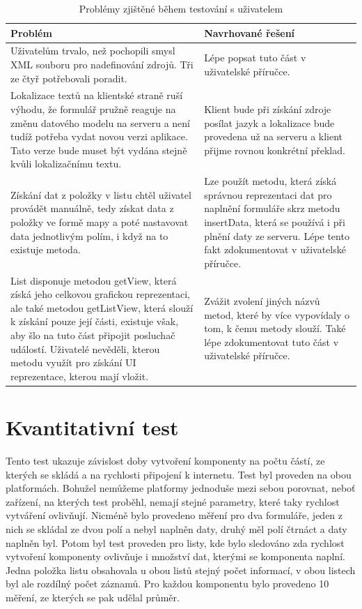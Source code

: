 \begin{table}[h!]
\begin{center}
\caption{Problémy zjištěné během testování s uživatelem}
\label{table:testIssues}
\begin{tabular}{|p{7cm}|p{7cm}|}
\hline
\textbf{Problém} & \textbf{Navrhované řešení} \\
\hline
Uživatelům trvalo, než pochopili smysl XML souboru pro nadefinování zdrojů. Tři ze čtyř potřebovali poradit. & Lépe popsat tuto část v uživatelské příručce. \\
\hline
Lokalizace textů na klientské straně ruší výhodu, že formulář pružně reaguje na změnu datového modelu na serveru a není tudíž potřeba vydat novou verzi aplikace. Tato verze bude muset být vydána stejně kvůli lokalizačnímu textu. & Klient bude při získání zdroje posílat jazyk a lokalizace bude provedena už na serveru a klient přijme rovnou konkrétní překlad. \\
\hline
Získání dat z položky v listu chtěl uživatel provádět manuálně, tedy získat data z položky ve formě mapy a poté nastavovat data jednotlivým polím, i když na to existuje metoda. & Lze použít metodu, která získá správnou reprezentaci dat pro naplnění formuláře skrz metodu insertData, která se používá i při plnění daty ze serveru. Lépe tento fakt zdokumentovat v uživatelské příručce. \\
\hline
List disponuje metodou getView, která získá jeho celkovou grafickou reprezentaci, ale také metodou getListView, která slouží k získání pouze její části, existuje však, aby šlo na tuto část připojit posluchač událostí. Uživatelé nevěděli, kterou metodu využít pro získání UI reprezentace, kterou mají vložit. & Zvážit zvolení jiných názvů metod, které by více vypovídaly o tom, k čemu metody slouží. Také lépe zdokumentovat tuto část v uživatelské příručce. \\
\hline
\end{tabular}
\end{center}
\end{table}

\section{Kvantitativní test} 
Tento test ukazuje závislost doby vytvoření komponenty na počtu částí, ze kterých se skládá a na rychlosti připojení k internetu. Test byl proveden na obou platformách. Bohužel nemůžeme platformy jednoduše mezi sebou porovnat, neboť zařízení, na kterých test proběhl, nemají stejné parametry, které taky rychlost vytváření ovlivňují. Nicméně bylo provedeno měření pro dva formuláře, jeden z nich se skládal ze dvou polí a nebyl naplněn daty, druhý měl polí čtrnáct a daty naplněn byl. Potom byl test proveden pro listy, kde bylo sledováno zda rychlost vytvoření komponenty ovlivňuje i množství dat, kterými se komponenta naplní. Jedna položka listu obsahovala u obou listů stejný počet informací, v obou listech byl ale rozdílný počet záznamů. Pro každou komponentu bylo provedeno 10 měření, ze kterých se pak udělal průměr. 

